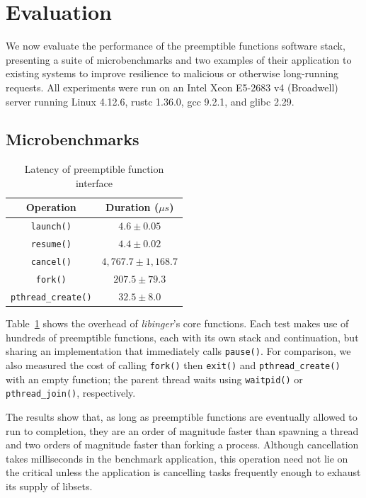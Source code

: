 \section{Evaluation}
\label{sec:eval}

We now evaluate the performance of the preemptible functions software stack,
presenting a suite of microbenchmarks and two examples of their application to
existing systems to improve resilience to malicious or otherwise long-running
requests.  All experiments were run on an Intel Xeon E5-2683 v4 (Broadwell)
server running Linux 4.12.6, rustc 1.36.0, gcc 9.2.1, and glibc 2.29.



\subsection{Microbenchmarks}

\begin{table}
\begin{center}
\begin{tabular}{c | c}
Operation & Duration ($\mu{s}$) \\
\hline
\texttt{launch()} & $4.6 \pm 0.05$ \\
\texttt{resume()} & $4.4 \pm 0.02$ \\
\texttt{cancel()} & $4,767.7 \pm 1,168.7$ \\
\hline
\texttt{fork()} & $207.5 \pm 79.3$ \\
\texttt{pthread\_create()} & $32.5 \pm 8.0$
\end{tabular}
\end{center}
\caption{Latency of preemptible function interface}
\label{tab:libinger}
\end{table}

Table~\ref{tab:libinger} shows the overhead of \textit{libinger}'s core functions.
Each test makes use of hundreds of preemptible functions, each with its own stack and
continuation, but sharing an implementation that immediately calls \texttt{pause()}.
For comparison, we also measured the cost of calling \texttt{fork()} then
\texttt{exit()} and \texttt{pthread\_create()} with an empty function; the parent
thread waits using \texttt{waitpid()} or \texttt{pthread\_join()}, respectively.

The results show that, as long as preemptible functions are eventually allowed to run
to completion, they are an order of magnitude faster than spawning a thread and two
orders of magnitude faster than forking a process.  Although cancellation takes
milliseconds in the benchmark application, this operation need not lie on the
critical unless the application is cancelling tasks frequently enough to exhaust its
supply of libsets.

